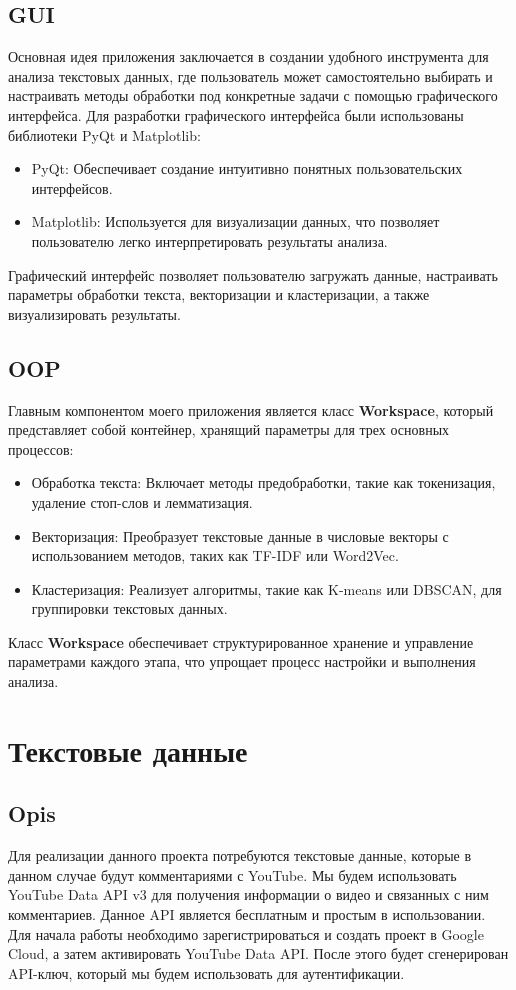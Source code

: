 	\subsection{GUI}
		Основная идея приложения заключается в создании удобного инструмента для анализа текстовых данных, где пользователь может самостоятельно выбирать и настраивать методы обработки под конкретные задачи с помощью графического интерфейса. Для разработки графического интерфейса были использованы библиотеки PyQt и Matplotlib:
		\begin{itemize}
			\item PyQt: Обеспечивает создание интуитивно понятных пользовательских интерфейсов.
			\item Matplotlib: Используется для визуализации данных, что позволяет пользователю легко интерпретировать результаты анализа.
		\end{itemize}
		Графический интерфейс позволяет пользователю загружать данные, настраивать параметры обработки текста, векторизации и кластеризации, а также визуализировать результаты.
		
	\subsection{OOP}
		Главным компонентом моего приложения является класс \textbf{Workspace}, который представляет собой контейнер, хранящий параметры для трех основных процессов:
		\begin{itemize}
			\item Обработка текста: Включает методы предобработки, такие как токенизация, удаление стоп-слов и лемматизация.
			\item Векторизация: Преобразует текстовые данные в числовые векторы с использованием методов, таких как TF-IDF или Word2Vec.
			\item Кластеризация: Реализует алгоритмы, такие как K-means или DBSCAN, для группировки текстовых данных.
		\end{itemize}
		Класс \textbf{Workspace} обеспечивает структурированное хранение и управление параметрами каждого этапа, что упрощает процесс настройки и выполнения анализа.
		
	
\section{Текстовые данные}

	\subsection{Opis}
		Для реализации данного проекта потребуются текстовые данные, которые в данном случае будут комментариями с YouTube. Мы будем использовать YouTube Data API v3 для получения информации о видео и связанных с ним комментариев. Данное API является бесплатным и простым в использовании. Для начала работы необходимо зарегистрироваться и создать проект в Google Cloud, а затем активировать YouTube Data API. После этого будет сгенерирован API-ключ, который мы будем использовать для аутентификации.
		
